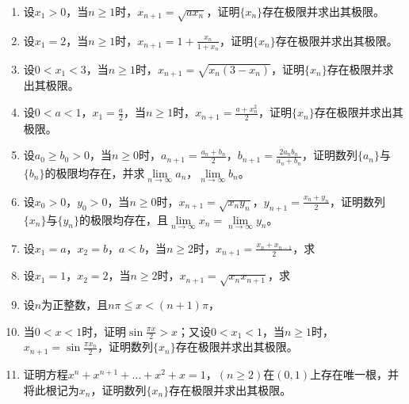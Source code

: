 \begin{enumerate}[{例}1.]
    \item 设$x_1>0$，当$n\geq1$时，$x_{n+1}=\sqrt{a x_n}$，证明$\{x_n\}$存在极限并求出其极限。
    \item 设$x_1=2$，当$n\geq1$时，$x_{n+1}=1+\frac{x_n}{1+x_n}$，证明$\{x_n\}$存在极限并求出其极限。
    \item 设$0<x_1<3$，当$n\geq1$时，$x_{n+1}=\sqrt{x_n(3-x_n)}$，证明$\{x_n\}$存在极限并求出其极限。
    \item 设$0<a<1$，$x_1 =\frac{a}{2}$，当$n\geq1$时，$x_{n+1}=\frac{a+x_n^2}{2}$，证明$\{x_n\}$存在极限并求出其极限。
    \item 设$a_0\geq b_0>0$，当$n\geq 0$时，$a_{n+1}=\frac{a_n+b_n}{2}$，$b_{n+1}=\frac{2 a_n b_n}{a_n + b_n}$，证明数列$\{a_n\}$与$\{b_n\}$的极限均存在，并求$\lim\limits_{n\to \infty}a_n$，$\lim\limits_{n \to \infty}b_n$。
    \item 设$x_0>0$，$y_0>0$，当$n\geq 0$时，$x_{n+1}=\sqrt{x_n y_n}$，$y_{n+1}=\frac{x_n + y_n}{2}$，证明数列$\{x_n\}$与$\{y_n\}$的极限均存在，且$\lim\limits_{n\to \infty}x_n=\lim\limits_{n \to \infty}y_n$。
    \item 设$x_1=a$，$x_2=b$，$a<b$，当$n\geq 2$时，$x_{n+1}=\frac{x_n +x_{n-1}}{2}$，求
    \item 设$x_1=1$，$x_2=2$，当$n\geq 2$时，$x_{n+1}=\sqrt{x_n x_{n+1}}$，求
    \item 设$n$为正整数，且$n \pi \leq x < (n+1) \pi$，
    \item 当$0<x<1$时，证明$\sin \frac{\pi x}{2} > x$；又设$0<x_1<1$，当$n\geq 1$时，$x_{n+1}=\sin\frac{\pi x_n}{2}$，证明数列$\{x_n\}$存在极限并求出其极限。
    \item 证明方程$x^n+x^{n+1}+\dots+x^2+x=1$，$(n\geq 2)$在$(0,1)$上存在唯一根，并将此根记为$x_n$，证明数列$\{x_n\}$存在极限并求出其极限。
\end{enumerate}
